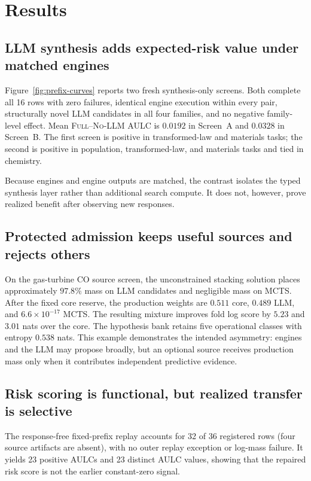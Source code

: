 \documentclass[twoside]{article}
\newcommand{\ours}{\textsc{Full}}
\newcommand{\nollm}{\textsc{No-LLM}}
\begin{document}
\section{Results}

\subsection{LLM synthesis adds expected-risk value under matched engines}

Figure~\ref{fig:prefix-curves} reports two fresh synthesis-only screens. Both
complete all 16 rows with zero failures, identical engine execution within
every pair, structurally novel LLM candidates in all four families, and no
negative family-level effect. Mean \ours{}--\nollm{} AULC is \(0.0192\) in
Screen~A and \(0.0328\) in Screen~B. The first screen is positive in
transformed-law and materials tasks; the second is positive in population,
transformed-law, and materials tasks and tied in chemistry.

Because engines and engine outputs are matched, the contrast isolates the
typed synthesis layer rather than additional search compute. It does not,
however, prove realized benefit after observing new responses.

\subsection{Protected admission keeps useful sources and rejects others}

On the gas-turbine CO source screen, the unconstrained stacking solution places
approximately \(97.8\%\) mass on LLM candidates and negligible mass on MCTS.
After the fixed core reserve, the production weights are
\(0.511\) core, \(0.489\) LLM, and \(6.6\times10^{-17}\) MCTS. The resulting
mixture improves fold log score by \(5.23\) and \(3.01\) nats over the core.
The hypothesis bank retains five operational classes with entropy \(0.538\)
nats. This example demonstrates the intended asymmetry: engines and the LLM
may propose broadly, but an optional source receives production mass only
when it contributes independent predictive evidence.

\subsection{Risk scoring is functional, but realized transfer is selective}

The response-free fixed-prefix replay accounts for 32 of 36 registered rows
(four source artifacts are absent), with no outer replay exception or
log-mass failure. It yields 23 positive AULCs and 23 distinct AULC values,
showing that the repaired risk score is not the earlier constant-zero signal.
\end{document}
